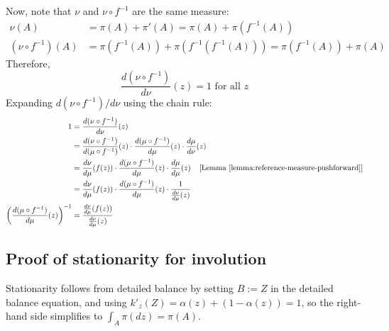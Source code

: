 \documentclass[twoside]{article}
\begin{document}
Now, note that $\nu$ and $\nu \circ f^{-1}$ are the same measure:
\begin{align}
\nu(A) &= \pi(A) + \pi'(A) = \pi(A) + \pi(f^{-1}(A))\\
(\nu \circ f^{-1})(A) &= \pi(f^{-1}(A)) + \pi(f^{-1}(f^{-1}(A))) = \pi(f^{-1}(A)) + \pi(A)
\end{align}
Therefore,
\[
\frac{d (\nu \circ f^{-1})}{d \nu}(z) = 1 \mbox{ for all } z
\]
Expanding $d(\nu \circ f^{-1}) / d \nu$ using the chain rule:
\begin{align}
1 &= \frac{d (\nu \circ f^{-1})}{d \nu}(z)\\
&=   \frac{d (\nu \circ f^{-1})}{d (\mu \circ f^{-1})}(z) \cdot
    \frac{d (\mu \circ f^{-1})}{d \mu}(z) \cdot
    \frac{d \mu}{d \nu}(z) \label{eq:mu-is-absolutely-continuous-with-respect-to-nu}\\
&= \frac{d \nu}{d \mu}(f(z)) \cdot \frac{d (\mu \circ f^{-1})}{d \mu}(z) \cdot \frac{d \mu}{d \mu}(z) \;\;\;\; [\mbox{Lemma~\ref{lemma:reference-measure-pushforward}}]\\
&= \frac{d \nu}{d \mu}(f(z)) \cdot \frac{d (\mu \circ f^{-1})}{d \mu}(z) \cdot \frac{1}{\frac{d \nu}{d \mu}(z)}\\
\left(\frac{d (\mu \circ f^{-1})}{d \mu}(z)\right)^{-1} &= \frac{\frac{d \nu}{d \mu}(f(z))}{\frac{d \nu}{d \mu}(z)}
\end{align}

\subsection{Proof of stationarity for involution} \label{sec:involution-is-stationary}
Stationarity follows from detailed balance by setting $B := Z$ in the detailed balance equation, and using $k'_z(Z) = \alpha(z) + (1 - \alpha(z)) =1$, so the right-hand side simplifies to $\int_A \pi(dz) = \pi(A)$.
\end{document}
